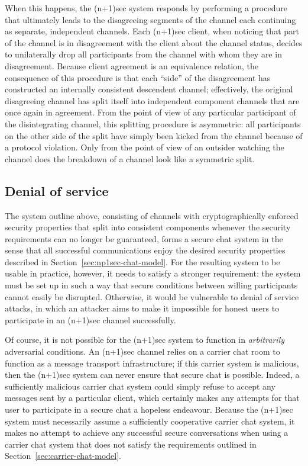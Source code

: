 \documentclass{article}
\begin{document}
When this happens, the (n+1)sec system responds by performing a procedure that ultimately leads to the disagreeing segments of the channel each continuing as separate, independent channels.
Each (n+1)sec client, when noticing that part of the channel is in disagreement with the client about the channel status, decides to unilaterally drop all participants from the channel with whom they are in disagreement.
Because client agreement is an equivalence relation, the consequence of this procedure is that each ``side'' of the disagreement has constructed an internally consistent descendent channel; effectively, the original disagreeing channel has split itself into independent component channels that are once again in agreement.
From the point of view of any particular participant of the disintegrating channel, this splitting procedure is asymmetric: all participants on the other side of the split have simply been kicked from the channel because of a protocol violation.
Only from the point of view of an outsider watching the channel does the breakdown of a channel look like a symmetric split.

\subsection{Denial of service}
The system outline above, consisting of channels with cryptographically enforced security properties that split into consistent components whenever the security requirements can no longer be guaranteed, forms a secure chat system in the sense that all successful communications enjoy the desired security properties described in Section~\ref{sec:np1sec-chat-model}.
For the resulting system to be usable in practice, however, it needs to satisfy a stronger requirement: the system must be set up in such a way that secure conditions between willing participants cannot easily be disrupted.
Otherwise, it would be vulnerable to denial of service attacks, in which an attacker aims to make it impossible for honest users to participate in an (n+1)sec channel successfully.

Of course, it is not possible for the (n+1)sec system to function in \emph{arbitrarily} adversarial conditions.
An (n+1)sec channel relies on a carrier chat room to function as a message transport infrastructure; if this carrier system is malicious, then the (n+1)sec system can never ensure that secure chat is possible.
Indeed, a sufficiently malicious carrier chat system could simply refuse to accept any messages sent by a particular client, which certainly makes any attempts for that user to participate in a secure chat a hopeless endeavour.
Because the (n+1)sec system must necessarily assume a sufficiently cooperative carrier chat system, it makes no attempt to achieve any successful secure conversations when using a carrier chat system that does not satisfy the requirements outlined in Section~\ref{sec:carrier-chat-model}.
\end{document}
